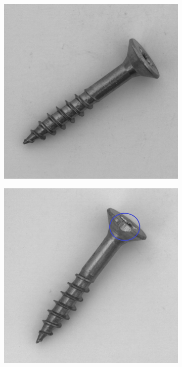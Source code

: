 \begin{figure}[htbp]
    \captionsetup[subfigure]{justification=centering}
    \centering
    \begin{subfigure}[b]{0.28\textwidth}
        \centering
        \includegraphics[width=\textwidth]{figures/introductionanomalies/033.png}

    \end{subfigure}
    \hspace{0.05\textwidth} %
    \begin{subfigure}[b]{0.28\textwidth}
        \centering
        \includegraphics[width=\textwidth]{figures/introductionanomalies/manifrontcopy.png}


\end{subfigure}
\end{figure}
